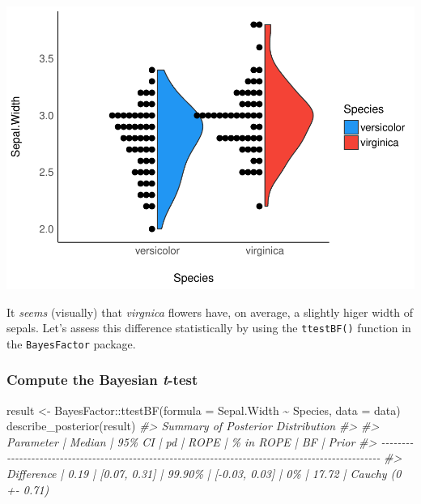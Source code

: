 \documentclass[10pt,a4paper,onecolumn]{article}
\newenvironment{Shaded}{\begin{snugshade}}{\end{snugshade}}
\newcommand{\AttributeTok}[1]{\textcolor[rgb]{0.77,0.63,0.00}{#1}}
\newcommand{\CommentTok}[1]{\textcolor[rgb]{0.56,0.35,0.01}{\textit{#1}}}
\newcommand{\FunctionTok}[1]{\textcolor[rgb]{0.00,0.00,0.00}{#1}}
\newcommand{\NormalTok}[1]{#1}
\newcommand{\OtherTok}[1]{\textcolor[rgb]{0.56,0.35,0.01}{#1}}
\newcommand{\SpecialCharTok}[1]{\textcolor[rgb]{0.00,0.00,0.00}{#1}}
\begin{document}
\includegraphics[width=1\linewidth]{paper_files/figure-latex/unnamed-chunk-36-1}

It \emph{seems} (visually) that \emph{virgnica} flowers have, on
average, a slightly higer width of sepals. Let's assess this difference
statistically by using the \texttt{ttestBF()} function in the
\texttt{BayesFactor} package.

\hypertarget{compute-the-bayesian-t-test}{%
\subsubsection{\texorpdfstring{Compute the Bayesian
\emph{t}-test}{Compute the Bayesian t-test}}\label{compute-the-bayesian-t-test}}

\begin{Shaded}
\begin{Highlighting}[]
\NormalTok{result }\OtherTok{\textless{}{-}}\NormalTok{ BayesFactor}\SpecialCharTok{::}\FunctionTok{ttestBF}\NormalTok{(}\AttributeTok{formula =}\NormalTok{ Sepal.Width }\SpecialCharTok{\textasciitilde{}}\NormalTok{ Species, }\AttributeTok{data =}\NormalTok{ data)}
\FunctionTok{describe\_posterior}\NormalTok{(result)}
\CommentTok{\#\textgreater{} Summary of Posterior Distribution}
\CommentTok{\#\textgreater{} }
\CommentTok{\#\textgreater{} Parameter  | Median |       95\% CI |     pd |          ROPE | \% in ROPE |    BF |              Prior}
\CommentTok{\#\textgreater{} {-}{-}{-}{-}{-}{-}{-}{-}{-}{-}{-}{-}{-}{-}{-}{-}{-}{-}{-}{-}{-}{-}{-}{-}{-}{-}{-}{-}{-}{-}{-}{-}{-}{-}{-}{-}{-}{-}{-}{-}{-}{-}{-}{-}{-}{-}{-}{-}{-}{-}{-}{-}{-}{-}{-}{-}{-}{-}{-}{-}{-}{-}{-}{-}{-}{-}{-}{-}{-}{-}{-}{-}{-}{-}{-}{-}{-}{-}{-}{-}{-}{-}{-}{-}{-}{-}{-}{-}{-}{-}{-}{-}{-}{-}{-}{-}{-}{-}{-}{-}}
\CommentTok{\#\textgreater{} Difference |   0.19 | [0.07, 0.31] | 99.90\% | [{-}0.03, 0.03] |        0\% | 17.72 | Cauchy (0 +{-} 0.71)}
\end{Highlighting}
\end{Shaded}
\end{document}
